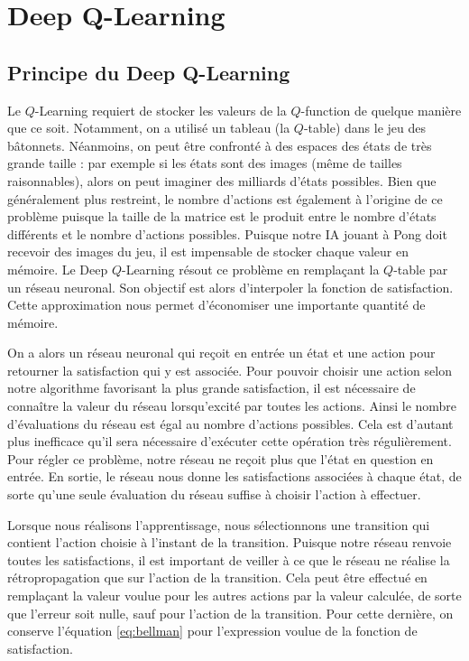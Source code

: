 \section{Deep Q-Learning}

\subsection{Principe du Deep Q-Learning}

Le $Q$-Learning requiert de stocker les valeurs de la $Q$-function de quelque manière que ce soit. Notamment, on a utilisé un tableau (la $Q$-table) dans le jeu des
bâtonnets. Néanmoins, on peut être confronté à des espaces des états de très grande taille : par exemple si les états sont des images (même de tailles raisonnables), 
alors on peut imaginer des milliards d'états possibles. Bien que généralement plus restreint, le nombre d'actions est également à l'origine de ce problème puisque la
taille de la matrice est le produit entre le nombre d'états différents et le nombre d'actions possibles. Puisque notre IA jouant à Pong doit recevoir des images du jeu,
il est impensable de stocker chaque valeur en mémoire. Le Deep $Q$-Learning résout ce problème en remplaçant la $Q$-table par un réseau neuronal. Son objectif est alors 
d'interpoler la fonction de satisfaction. Cette approximation nous permet d'économiser une importante quantité de mémoire.

On a alors un réseau neuronal qui reçoit en entrée un état et une action pour retourner la satisfaction qui y est associée. Pour pouvoir choisir une action selon
notre algorithme favorisant la plus grande satisfaction, il est nécessaire de connaître la valeur du réseau lorsqu'excité par toutes les actions. Ainsi
le nombre d'évaluations du réseau est égal au nombre d'actions possibles. Cela est d'autant plus inefficace qu'il sera nécessaire d'exécuter cette opération très
régulièrement. Pour régler ce problème, notre réseau ne reçoit plus que l'état en question en entrée. En sortie, le réseau nous donne les satisfactions associées à chaque 
état, de sorte qu'une seule évaluation du réseau suffise à choisir l'action à effectuer.

Lorsque nous réalisons l'apprentissage, nous sélectionnons une transition qui contient l'action choisie à l'instant de la transition. Puisque notre réseau renvoie
toutes les satisfactions, il est important de veiller à ce que le réseau ne réalise la rétropropagation que sur l'action de la transition. Cela peut être 
effectué en remplaçant la valeur voulue pour les autres actions par la valeur calculée, de sorte que l'erreur soit nulle, sauf pour l'action de la transition.
Pour cette dernière, on conserve l'équation \ref{eq:bellman} pour l'expression voulue de la fonction de satisfaction.

